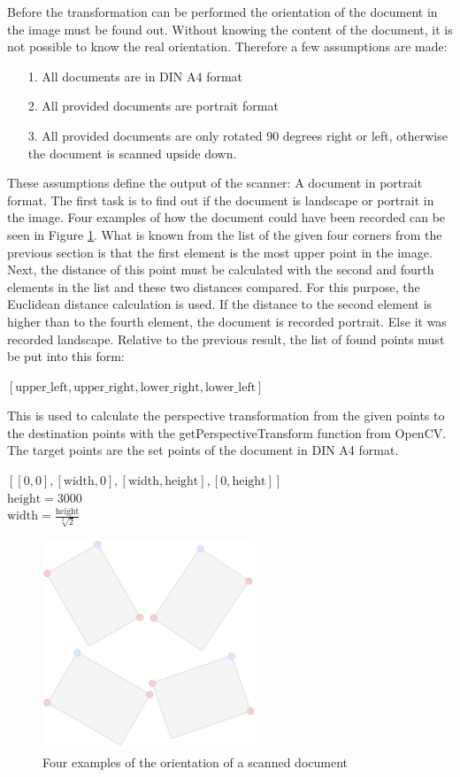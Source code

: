 \documentclass[twocolumn,10pt]{asme2ej}
\newcommand*\redcircled[1]{\tikz[baseline=(char.base)]{
            \node[shape=circle,draw,inner sep=2pt, fill=red!40] (char) {#1};}}
\newcommand*\bluecircled[1]{\tikz[baseline=(char.base)]{
            \node[shape=circle,draw,inner sep=2pt, fill=blue!40] (char) {#1};}}
\begin{document}
Before the transformation can be performed the orientation of the document in the image must be found out.
Without knowing the content of the document, it is not possible to know the real orientation. Therefore a few assumptions are made:
\begin{itemize}
    \item[1.] All documents are in DIN A4 format
    \item[2.] All provided documents are portrait format
    \item[3.] All provided documents are only rotated 90 degrees right or left, otherwise the document is scanned upside down.
\end{itemize}
These assumptions define the output of the scanner: A document in portrait format.
The first task is to find out if the document is landscape or portrait in the image.
Four examples of how the document could have been recorded can be seen in Figure \ref{fig:fourcorners}.
What is known from the list of the given four corners from the previous section is that the first element \bluecircled{-} is the most upper point in the image. 
Next, the distance of this point must be calculated with the second and fourth elements \redcircled{-} in the list and these two distances compared. For this purpose, the Euclidean distance calculation is used. If the distance to the second element is higher than to the fourth element, the document is recorded portrait. Else it was recorded landscape. 
Relative to the previous result, the list of found points must be put into this form:
\begin{center}
    \noindent
    $[\textrm{upper\_left}, \textrm{upper\_right}, \textrm{lower\_right}, \textrm{lower\_left}]$
\end{center}
This is used to calculate the perspective transformation from the given points to the destination points with the getPerspectiveTransform function from OpenCV\cite{opencv_getPerspectiveTransform}. The target points are the set points of the document in DIN A4 format.
\begin{center}
    \noindent
    $[[0,0], [\textrm{width},0], [\textrm{width},\textrm{height}], [0,\textrm{height}]]$\\
    $\textrm{height}=3000$\\
    $\textrm{width}=\frac{\textrm{height}}{\sqrt[2]{2}}$
\end{center}
\begin{figure}[H]
    \centerline{\includegraphics[width=2.5in]{output/a.png}}
    \caption{Four examples of the orientation of a scanned document}
    \label{fig:fourcorners}
\end{figure}
\end{document}
